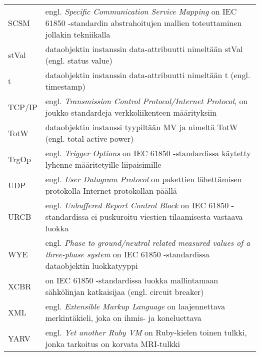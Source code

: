 \begin{tabularx}{\linewidth}[h]{@{} p{} p{} @{}}
	SCSM & engl. \emph{Specific Communication Service Mapping} on IEC 61850 -standardin abstrahoitujen mallien toteuttaminen jollakin tekniikalla \\
	stVal & dataobjektin instanssin data-attribuutti nimeltään stVal (engl. status value) \\
	t & dataobjektin instanssin data-attribuutti nimeltään t (engl. timestamp) \\
	TCP/IP & engl. \emph{Transmission Control Protocol/Internet Protocol}, on joukko standardeja verkkoliikenteen määrityksiin \\
	TotW & dataobjektin instanssi tyypiltään MV ja nimeltä TotW (engl. total active power) \\
	TrgOp & engl. \emph{Trigger Options} on IEC 61850 -standardissa käytetty lyhenne määritetyille liipaisimille \\
	UDP & engl. \emph{User Datagram Protocol} on pakettien lähettämisen protokolla Internet protokollan päällä \\
	URCB & engl. \emph{Unbuffered Report Control Block} on IEC 61850 -standardissa ei puskuroitu viestien tilaamisesta vastaava luokka \\
	WYE & engl. \emph{Phase to ground/neutral related measured values of a three-phase system} on IEC 61850 -standardissa dataobjektin luokkatyyppi \\
	XCBR & on IEC 61850 -standardissa luokka mallintamaan sähkölinjan katkaisijaa (engl. circuit breaker) \\
	XML & engl. \emph{Extensible Markup Language} on laajennettava merkintäkieli, joka on ihmis- ja koneluettava \\
	YARV & engl. \emph{Yet another Ruby VM} on Ruby-kielen toinen tulkki, jonka tarkoitus on korvata MRI-tulkki \\
\end{tabularx}